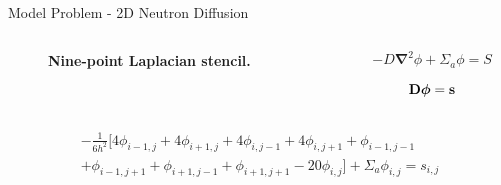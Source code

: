 \documentclass{beamer}
\begin{document}
\begin{frame}{Model Problem - 2D Neutron Diffusion}

  \begin{columns}

    \begin{column}{0.5\textwidth}
      \begin{figure}[t!]
        \begin{center}
          \scalebox{0.5}{}
        \end{center}
        \caption{\textbf{Nine-point Laplacian stencil.}}
        \label{fig:stencil}
      \end{figure}
    \end{column}

    \begin{column}{0.5\textwidth}
      \begin{equation}
        -D \boldsymbol{\nabla}^2 \phi + \Sigma_a \phi = S
        \label{eq:diffusion_eq_simple}
      \end{equation}

      \begin{equation}
        \mathbf{D}\boldsymbol{\phi}=\mathbf{s}
        \label{eq:operator_system}
      \end{equation}
    \end{column}

  \end{columns}

  \begin{multline}
    -\frac{1}{6h^2}[4 \phi_{i-1,j} + 4 \phi_{i+1,j} + 4 \phi_{i,j-1} + 4
      \phi_{i,j+1} + \phi_{i-1,j-1}\\ + \phi_{i-1,j+1} + \phi_{i+1,j-1}
      + \phi_{i+1,j+1} - 20 \phi_{i,j}] + \Sigma_a \phi_{i,j} = s_{i,j}
    \label{eq:fd_system}
  \end{multline}

\end{frame}
\end{document}
